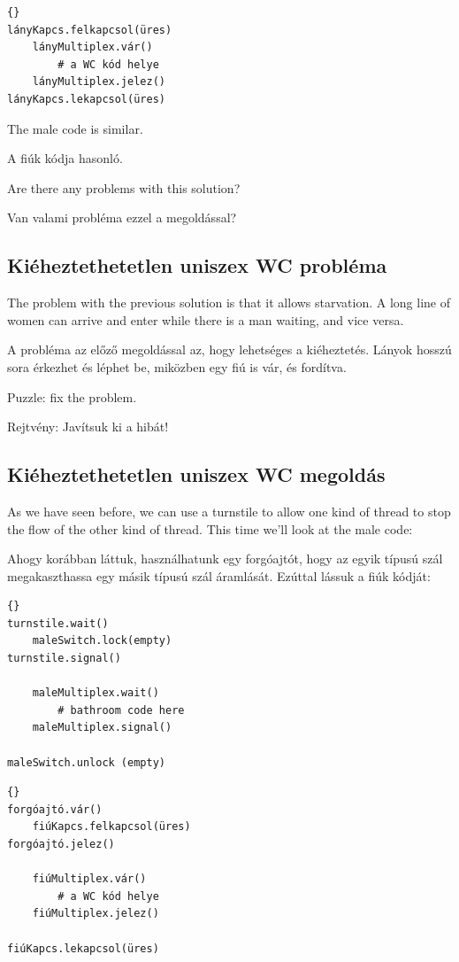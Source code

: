 \documentclass{book}
\newcommand{\clearemptydoublepage}{\newpage\cleardoublepage}
\begin{document}
\begin{lstlisting}[title={Uniszex WC megoldás (lányok)}]{}
lányKapcs.felkapcsol(üres)
    lányMultiplex.vár()
        # a WC kód helye
    lányMultiplex.jelez()
lányKapcs.lekapcsol(üres)
\end{lstlisting}

The male code is similar.

A fiúk kódja hasonló.

Are there any problems with this solution?

Van valami probléma ezzel a megoldással?

\clearemptydoublepage
\subsection{Kiéheztethetetlen uniszex WC probléma}

The problem with the previous solution is that it allows starvation.
A long line of women can arrive and enter while there is a man
waiting, and vice versa.

A probléma az előző megoldással az, hogy lehetséges a kiéheztetés.
Lányok hosszú sora érkezhet és léphet be, miközben egy fiú is
vár, és fordítva.

Puzzle: fix the problem.

Rejtvény: Javítsuk ki a hibát! 


\clearemptydoublepage
\subsection{Kiéheztethetetlen uniszex WC megoldás}

As we have seen before, we can use a turnstile to allow one
kind of thread to stop the flow of the other kind of thread.
This time we'll look at the male code:

Ahogy korábban láttuk, használhatunk egy forgóajtót, hogy
az egyik típusú szál megakaszthassa egy másik típusú szál áramlását.
Ezúttal lássuk a fiúk kódját:

\begin{lstlisting}[title={No-starve unisex bathroom solution (male)}]{}
turnstile.wait()
    maleSwitch.lock(empty)
turnstile.signal()

    maleMultiplex.wait()
        # bathroom code here
    maleMultiplex.signal()

maleSwitch.unlock (empty)
\end{lstlisting}

\begin{lstlisting}[title={Kiéheztethetetlen uniszex WC megoldás (fiúk)}]{}
forgóajtó.vár()
    fiúKapcs.felkapcsol(üres)
forgóajtó.jelez()

    fiúMultiplex.vár()
        # a WC kód helye
    fiúMultiplex.jelez()

fiúKapcs.lekapcsol(üres)
\end{lstlisting}
\end{document}
